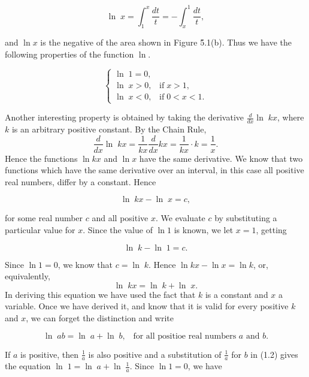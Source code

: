 $$
\ln\; x = \int_{1}^{x} \frac{dt}{t} = -\int_{x}^{1} \frac{dt}{t},
$$

\noindent and $\ln x$ is the negative of the area shown in Figure \f{5.1}(b). Thus we have the following properties of the function $\ln$.

\begin{theorem}
$$
\left \{ \begin{array}{l}
                           \ln\; 1 = 0,\\
                           \ln\; x > 0, \;\;\;\mbox{if} \;x > 1, \\
                           \ln\; x < 0, \;\;\;\mbox{if} \;0 < x < 1. 
     \end{array}
\right.
$$
\end{theorem}


Another interesting property is obtained by taking the derivative $\frac{d}{dx} \ln\; kx$, where $k$ is an arbitrary positive constant. By the Chain Rule,
$$
\frac{d}{dx} \ln\; kx = \frac{1}{kx} \frac{d}{dx} kx = \frac{1}{kx} \cdot k = \frac{1}{x}. 
$$
\noindent Hence the functions $\ln kx$ and $\ln x$ have the same derivative.
We know that two functions which have the same derivative over an interval, in this case
all positive real numbers, differ by a constant. Hence 

$$
\ln\; kx - \ln\; x = c,
$$

\noindent for some real number $c$ and all positive $x$. We evaluate $c$ by substituting a particular value for $x$. Since the value of $\ln 1$ is known, we let $x = 1$, getting 

$$\ln\; k - \ln\; 1 = c.
$$

\noindent Since $\ln 1 = 0$, we know that $c = \ln\; k$. Hence $\ln kx - \ln x = \ln k$, or, equivalently,
$$
\ln\; kx = \ln\; k + \ln\; x.
$$
\noindent In deriving this equation we have used the fact that $k$ is a constant and $x$ a variable.  Once we have derived it, and know that it is valid for every positive $k$ and $x$, we can forget the distinction and write

\begin{theorem}
$$ 
\ln\; ab = \ln\; a + \ln\; b, \;\;\;\mbox{for all positioe real numbers $a$ and $b$}.
$$
\end{theorem}

If $a$ is positive, then $\frac{1}{a}$ is also positive and a substitution of $\frac{1}{a}$ for $b$ in (1.2) gives the equation $\ln\; 1 = \ln\; a + \ln\; \frac{1}{a} $. Since $\ln 1 = 0$, we have
 

